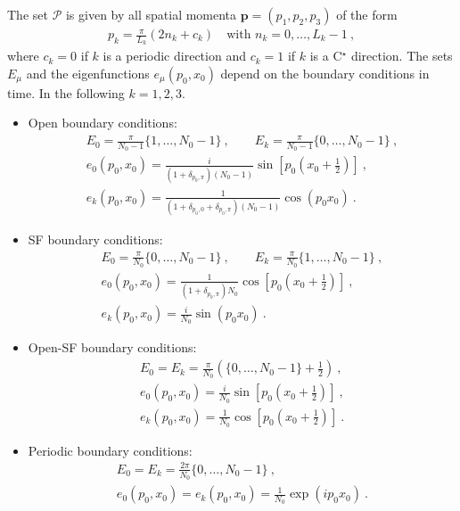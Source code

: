 \documentclass[11pt,fleqn]{article}
\renewcommand{\vec}[1]{\mathbf{#1}}
\begin{document}
The set $\mathcal{P}$ is given by all spatial momenta $\vec{p} = (p_1,p_2,p_3)$ of the form
\begin{gather}
   p_k = \tfrac{\pi}{L_k} (2n_k+c_k) \quad \text{with } n_k=0,\dots,L_k-1 \ ,
\end{gather}
where $c_k=0$ if $k$ is a periodic direction and $c_k=1$ if $k$ is a C$^\star$ direction. The sets $E_\mu$ and the eigenfunctions $e_\mu(p_0,x_0)$ depend on the boundary conditions in time. In the following $k=1,2,3$.
\begin{itemize}
   \item Open boundary conditions:
   \begin{gather}
      E_0 = \frac{\pi}{N_0-1} \{ 1 , \dots , N_0-1 \} \ , \qquad
      E_k = \frac{\pi}{N_0-1} \{ 0 , \dots , N_0-1 \} \ , \\
      e_0(p_0,x_0) = \frac{i}{(1+\delta_{p_0,\pi})(N_0-1)} \sin \left[ p_0\left(x_0 + \frac{1}{2} \right) \right] \ , \\
      e_k(p_0,x_0) = \frac{1}{(1+\delta_{p_0,0}+\delta_{p_0,\pi})(N_0-1)} \cos ( p_0 x_0 ) \ .
   \end{gather}
   \item SF boundary conditions:
   \begin{gather}
      E_0 = \frac{\pi}{N_0} \{ 0 , \dots , N_0-1 \} \ , \qquad
      E_k = \frac{\pi}{N_0} \{ 1 , \dots , N_0-1 \} \ , \\
      e_0(p_0,x_0) = \frac{1}{(1+\delta_{p_0,\pi})N_0} \cos \left[ p_0\left(x_0 + \frac{1}{2} \right) \right] \ , \\
      e_k(p_0,x_0) = \frac{i}{N_0} \sin ( p_0 x_0 ) \ .
   \end{gather}
   \item Open-SF boundary conditions:
   \begin{gather}
      E_0 = E_k = \frac{\pi}{N_0} \left( \{ 0 , \dots , N_0-1 \} + \frac{1}{2} \right) \ , \\
      e_0(p_0,x_0) = \frac{i}{N_0} \sin \left[ p_0\left(x_0 + \frac{1}{2} \right) \right] \ , \\
      e_k(p_0,x_0) = \frac{1}{N_0} \cos \left[ p_0\left(x_0 + \frac{1}{2} \right) \right] \ .
   \end{gather}
   \item Periodic boundary conditions:
   \begin{gather}
      E_0 = E_k = \frac{2\pi}{N_0} \{ 0 , \dots , N_0-1 \} \ , \\
      e_0(p_0,x_0) = e_k(p_0,x_0) = \frac{1}{N_0} \exp ( i p_0 x_0 ) \ .
   \end{gather}
\end{itemize}
\end{document}
